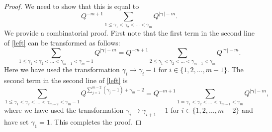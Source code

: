 \documentclass[10pt,a4paper]{amsart}
\newcommand{\posi}{{\gamma}}
\newcommand{\pos}{{\boldsymbol\gamma}}
\begin{document}
\begin{proof}
We need to show that this is equal to
$$
Q^{-m+1} \sum_{1 \le \posi_1 < \posi_2 < \dots < \posi_m} Q^{|\pos|-m}.
$$
We provide a combinatorial proof.
First note that the first term in the second line of \eqref{left} can be transformed as follows:
$$
\sum_{1 \le \posi_1 < \posi_2 < \dots < \posi_{m-1} < \posi_m-1} Q^{|\pos|-m} =
Q^{-m+1} \sum_{2 \le \posi_1 < \posi_2 < \dots < \posi_{m-1} < \posi_m} Q^{|\pos|-m}.
$$
Here we have used the transformation $\posi_i \to \posi_i-1$ for $i \in \{1,2,\dots,m-1\}$. The second term
in the second line of \eqref{left} is
$$
\sum_{1 \le \posi_1 < \posi_2 < \dots < \posi_{m-2} < \posi_m-1} Q^{\sum_{j=1}^{m-2} (\posi_j-1)+\posi_{m}-2} =
Q^{-m+1} \sum_{1=\posi_1 < \posi_2 < \dots < \posi_{m-1} < \posi_m} Q^{|\pos|-m},
$$
where we have used the transformation $\posi_i \to \posi_{i+1}-1$ for $i \in \{1,2,\dots,m-2\}$ and have set $\posi_1=1$.
This completes the proof.
\end{proof}
\end{document}
